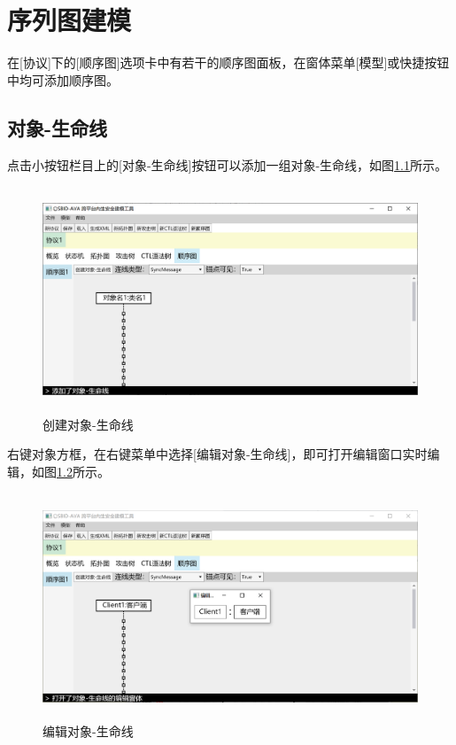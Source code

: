 \chapter{序列图建模}
在[协议]下的[顺序图]选项卡中有若干的顺序图面板，在窗体菜单[模型]或快捷按钮中均可添加顺序图。

\section{对象-生命线}
点击小按钮栏目上的[对象-生命线]按钮可以添加一组对象-生命线，如图\ref{obj_lifeline}所示。
\begin{figure}[h]
	\centering
	\includegraphics[width=12cm,height=6.75cm]{imgs/obj_lifeline.png}
	\caption{创建对象-生命线}
	\label{obj_lifeline}
\end{figure}
\par
右键对象方框，在右键菜单中选择[编辑对象-生命线]，即可打开编辑窗口实时编辑，如图\ref{obj_edit}所示。
\begin{figure}[h]
	\centering
	\includegraphics[width=12cm,height=6.75cm]{imgs/obj_edit.png}
	\caption{编辑对象-生命线}
	\label{obj_edit}
\end{figure}

